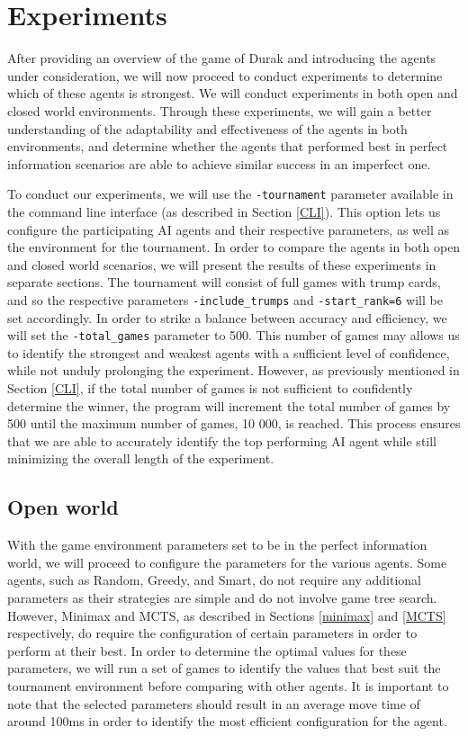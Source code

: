 \chapter{Experiments}

After providing an overview of the game of Durak and introducing the agents under consideration, we will now proceed to conduct experiments to determine which of these agents is strongest. We will conduct experiments in both open and closed world environments. Through these experiments, we will gain a better understanding of the adaptability and effectiveness of the agents in both environments, and determine whether the agents that performed best in perfect information scenarios are able to achieve similar success in an imperfect one.

To conduct our experiments, we will use the \texttt{-tournament} parameter available in the command line interface (as described in Section \ref{CLI}). This option lets us configure the participating AI agents and their respective parameters, as well as the environment for the tournament. In order to compare the agents in both open and closed world scenarios, we will present the results of these experiments in separate sections. The tournament will consist of full games with trump cards, and so the respective parameters \texttt{-include\_trumps} and \texttt{-start\_rank=6} will be set accordingly. In order to strike a balance between accuracy and efficiency, we will set the \texttt{-total\_games} parameter to 500. This number of games may allows us to identify the strongest and weakest agents with a sufficient level of confidence, while not unduly prolonging the experiment. However, as previously mentioned in Section \ref{CLI}, if the total number of games is not sufficient to confidently determine the winner, the program will increment the total number of games by 500 until the maximum number of games, 10 000, is reached. This process ensures that we are able to accurately identify the top performing AI agent while still minimizing the overall length of the experiment.

\section{Open world}

With the game environment parameters set to be  in the perfect information world, we will proceed to configure the parameters for the various agents. Some agents, such as Random, Greedy, and Smart, do not require any additional parameters as their strategies are simple and do not involve game tree search. However, Minimax and MCTS, as described in Sections \ref{minimax} and \ref{MCTS} respectively, do require the configuration of certain parameters in order to perform at their best. In order to determine the optimal values for these parameters, we will run a set of games to identify the values that best suit the tournament environment before comparing with other agents. It is important to note that the selected parameters should result in an average move time of around 100ms in order to identify the most efficient configuration for the agent.

